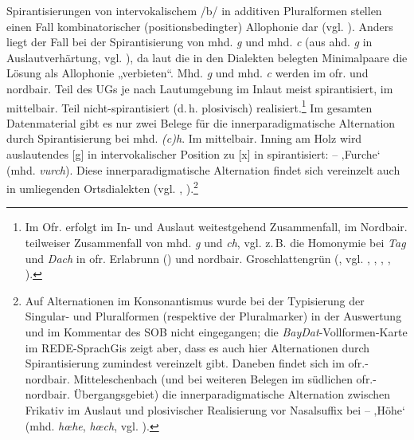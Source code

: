 Spirantisierungen von intervokalischem /b/ in additiven Pluralformen stellen einen Fall kombinatorischer (positionsbedingter) Allophonie dar (vgl. \citealt[125]{Rowley1997}). Anders liegt der Fall bei der Spirantisierung von mhd. \textit{g} und mhd. \textit{c} (aus ahd. \textit{g} in Auslautverhärtung, vgl. \citealt[218--219]{SMF4}), da laut \citet[125]{Rowley1997} die in den Dialekten belegten Minimalpaare die Lösung als Allophonie „verbieten“. Mhd. \textit{g} und mhd. \textit{c} werden im ofr. und nordbair. Teil des UGs je nach Lautumgebung im Inlaut meist spirantisiert, im mittelbair. Teil nicht-spirantisiert (d.\,h. plosivisch) realisiert.\footnote{Im Ofr. erfolgt im In- und Auslaut weitestgehend Zusammenfall, im Nordbair. teilweiser Zusammenfall von mhd. \textit{g} und \textit{ch}, vgl. z.\,B. die Homonymie bei \textit{Tag} und \textit{Dach} in ofr. Erlabrunn () und nordbair. Groschlattengrün (, vgl. \citealt[Karte 29]{Gütter1971}, \citealt[§29]{Kranzmayer1956}, \citealt[79]{Rowley1997}, \citealt[216--219]{SMF4}, \citealt[241--250]{Steger1968}).} Im gesamten Datenmaterial gibt es nur zwei Belege für die innerparadigmatische Alternation durch Spirantisierung bei mhd. \textit{(c)h}. Im mittelbair. Inning am Holz wird auslautendes [g] in intervokalischer Position zu [x] in spirantisiert:  --  ‚Furche‘ (mhd. \textit{vurch}). Diese innerparadigmatische Alternation findet sich vereinzelt auch in umliegenden Ortsdialekten (vgl. \citealt[177 und Karten 40/41]{SNiB7}, \citealt[Karte 86]{SOB4}).\footnote{Auf Alternationen im Konsonantismus wurde bei der Typisierung der Singular- und Pluralformen (respektive der Pluralmarker) in der Auswertung und im Kommentar des SOB nicht eingegangen; die \textit{BayDat}-Vollformen-Karte im REDE-SprachGis zeigt aber, dass es auch hier Alternationen durch Spirantisierung zumindest vereinzelt gibt. Daneben findet sich im ofr.-nordbair. Mitteleschenbach (und bei weiteren Belegen im südlichen ofr.-nordbair. Übergangsgebiet) die innerparadigmatische Alternation zwischen Frikativ im Auslaut und plosivischer Realisierung vor Nasalsuffix bei  --  ‚Höhe‘ (mhd. \textit{hœhe}, \textit{hœch}, vgl. \citealt[273]{SMF4}).} 

